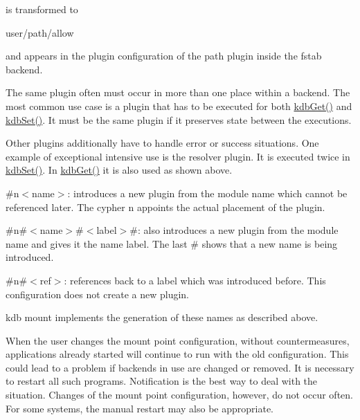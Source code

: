 

is transformed to


\begin{DoxyCode}
user/path/allow
\end{DoxyCode}


and appears in the plugin configuration of the path plugin inside the fstab backend.

The same plugin often must occur in more than one place within a backend. The most common use case is a plugin that has to be executed for both {\ttfamily \hyperlink{group__kdb_ga28e385fd9cb7ccfe0b2f1ed2f62453a1}{kdb\+Get()}} and {\ttfamily \hyperlink{group__kdb_ga11436b058408f83d303ca5e996832bcf}{kdb\+Set()}}. It must be the same plugin if it preserves state between the executions.

Other plugins additionally have to handle error or success situations. One example of exceptional intensive use is the resolver plugin. It is executed twice in {\ttfamily \hyperlink{group__kdb_ga11436b058408f83d303ca5e996832bcf}{kdb\+Set()}}. In {\ttfamily \hyperlink{group__kdb_ga28e385fd9cb7ccfe0b2f1ed2f62453a1}{kdb\+Get()}} it is also used as shown above.


\begin{DoxyItemize}
\item {\ttfamily \#n$<$name$>$}\+: introduces a new plugin from the module {\ttfamily name} which cannot be referenced later. The cypher {\ttfamily n} appoints the actual placement of the plugin.
\item {\ttfamily \#n\#$<$name$>$\#$<$label$>$\#}\+: also introduces a new plugin from the module {\ttfamily name} and gives it the name {\ttfamily label}. The last {\ttfamily \#} shows that a new name is being introduced.
\item {\ttfamily \#n\#$<$ref$>$}\+: references back to a label which was introduced before. This configuration does not create a new plugin.
\end{DoxyItemize}

{\ttfamily kdb mount} implements the generation of these names as described above.

When the user changes the mount point configuration, without countermeasures, applications already started will continue to run with the old configuration. This could lead to a problem if backends in use are changed or removed. It is necessary to restart all such programs. Notification is the best way to deal with the situation. Changes of the mount point configuration, however, do not occur often. For some systems, the manual restart may also be appropriate.

